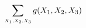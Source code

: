 \documentclass[preview]{standalone}
\begin{document}
\begin{align*}
\special{dvisvgm:raw <g id='unique000'>}\sum_{\scriptscriptstyle X_1, X_2, X_3} g(X_1, X_2, X_3)\special{dvisvgm:raw </g>}
\end{align*}
\end{document}
